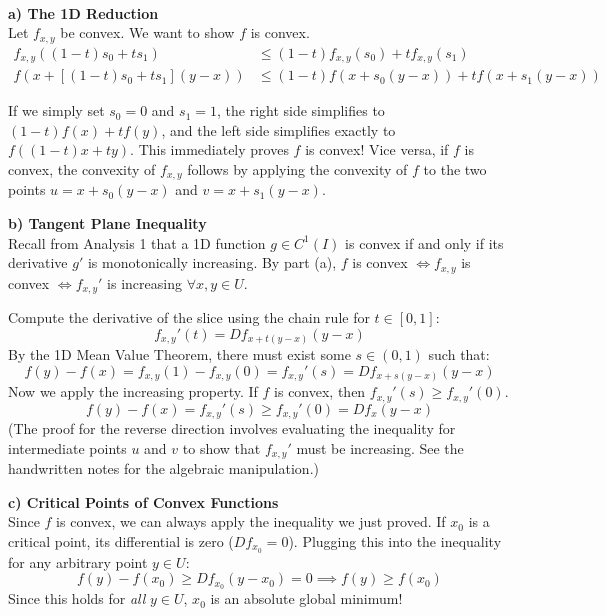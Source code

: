 \begin{solution}\hfill\\
\textbf{a) The 1D Reduction} \\
Let $f_{x,y}$ be convex. We want to show $f$ is convex.
\begin{equation}
\begin{aligned}
    f_{x,y}((1-t)s_0 + t s_1) &\le (1-t)f_{x,y}(s_0) + t f_{x,y}(s_1) \\
    f(x + [(1-t)s_0 + t s_1](y-x)) &\le (1-t)f(x + s_0(y-x)) + t f(x + s_1(y-x)) 
\end{aligned}
\end{equation}

If we simply set $s_0 = 0$ and $s_1 = 1$, the right side simplifies to $(1-t)f(x) + t f(y)$, and the left side simplifies exactly to $f((1-t)x + ty)$. This immediately proves $f$ is convex!
Vice versa, if $f$ is convex, the convexity of $f_{x,y}$ follows by applying the convexity of $f$ to the two points $u = x + s_0(y-x)$ and $v = x + s_1(y-x)$.

\vspace{0.3cm}
\textbf{b) Tangent Plane Inequality} \\
Recall from Analysis 1 that a 1D function $g \in C^1(I)$ is convex if and only if its derivative $g'$ is monotonically increasing. 
By part (a), $f$ is convex $\iff f_{x,y}$ is convex $\iff f_{x,y}'$ is increasing $\forall x,y \in U$.

Compute the derivative of the slice using the chain rule for $t \in [0,1]$:
\[ f_{x,y}'(t) = Df_{x + t(y-x)}(y-x) \]
By the 1D Mean Value Theorem, there must exist some $s \in (0,1)$ such that:
\[ f(y) - f(x) = f_{x,y}(1) - f_{x,y}(0) = f_{x,y}'(s) = Df_{x + s(y-x)}(y-x) \]
Now we apply the increasing property. If $f$ is convex, then $f_{x,y}'(s) \ge f_{x,y}'(0)$.
\[ f(y) - f(x) = f_{x,y}'(s) \ge f_{x,y}'(0) = Df_x(y-x) \]
\textcolor{eGray}{(The proof for the reverse direction involves evaluating the inequality for intermediate points $u$ and $v$ to show that $f_{x,y}'$ must be increasing. See the handwritten notes for the algebraic manipulation.)}

\vspace{0.3cm}
\textbf{c) Critical Points of Convex Functions} \\
Since $f$ is convex, we can always apply the inequality we just proved. If $x_0$ is a critical point, its differential is zero ($Df_{x_0} = 0$). Plugging this into the inequality for any arbitrary point $y \in U$:
\[ f(y) - f(x_0) \ge Df_{x_0}(y - x_0) = 0 \implies f(y) \ge f(x_0) \]
Since this holds for \emph{all} $y \in U$, $x_0$ is an absolute global minimum!
\end{solution}

